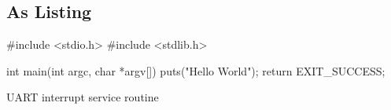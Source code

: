 \documentclass{uibk}
\begin{document}
\subsection{As Listing}
\label{sub:as_listing}

\begin{listing}[h!]
    \begin{ccode}
        #include <stdio.h>
        #include <stdlib.h>

        int main(int argc, char *argv[]) {
            puts("Hello World");
            return EXIT_SUCCESS;
        }
    \end{ccode}
    \caption{UART interrupt service routine}
    \label{lst:uart_isr}
\end{listing}
\end{document}
